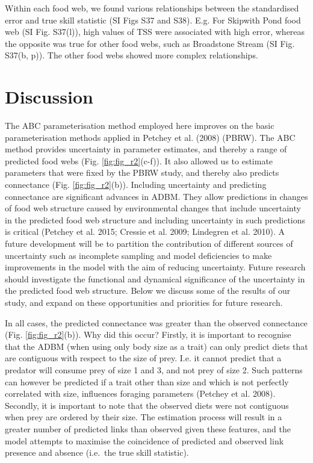 \documentclass{article}
\begin{document}
Within each food web, we found various relationships between the
standardised error and true skill statistic (SI Figs S37 and S38). E.g.
For Skipwith Pond food web (SI Fig. S37(l)), high values of TSS were
associated with high error, whereas the opposite was true for other food
webs, such as Broadstone Stream (SI Fig. S37(b, p)). The other food webs
showed more complex relationships.

\hypertarget{discussion}{%
\section{Discussion}\label{discussion}}

The ABC parameterisation method employed here improves on the basic
parameterisation methods applied in Petchey et al. (2008) (PBRW). The
ABC method provides uncertainty in parameter estimates, and thereby a
range of predicted food webs (Fig. \ref{fig:fig_r2}(c-f)). It also
allowed us to estimate parameters that were fixed by the PBRW study, and
thereby also predicts connectance (Fig. \ref{fig:fig_r2}(b)). Including
uncertainty and predicting connectance are significant advances in ADBM.
They allow predictions in changes of food web structure caused by
environmental changes that include uncertainty in the predicted food web
structure and including uncertainty in such predictions is critical
(Petchey et al. 2015; Cressie et al. 2009; Lindegren et al. 2010). A
future development will be to partition the contribution of different
sources of uncertainty such as incomplete sampling and model
deficiencies to make improvements in the model with the aim of reducing
uncertainty. Future research should investigate the functional and
dynamical significance of the uncertainty in the predicted food web
structure. Below we discuss some of the results of our study, and expand
on these opportunities and priorities for future research.

In all cases, the predicted connectance was greater than the observed
connectance (Fig. \ref{fig:fig_r2}(b)). Why did this occur? Firstly, it
is important to recognise that the ADBM (when using only body size as a
trait) can only predict diets that are contiguous with respect to the
size of prey. I.e. it cannot predict that a predator will consume prey
of size 1 and 3, and not prey of size 2. Such patterns can however be
predicted if a trait other than size and which is not perfectly
correlated with size, influences foraging parameters (Petchey et al.
2008). Secondly, it is important to note that the observed diets were
not contiguous when prey are ordered by their size. The estimation
process will result in a greater number of predicted links than observed
given these features, and the model attempts to maximise the coincidence
of predicted and observed link presence and absence (i.e.~the true skill
statistic).
\end{document}
